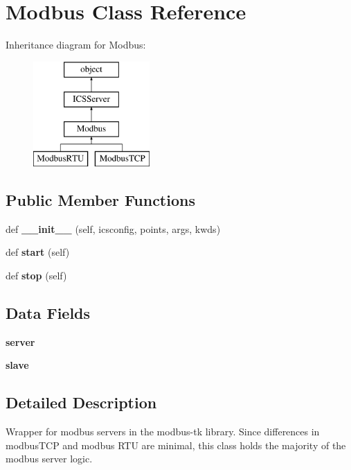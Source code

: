 \section{Modbus Class Reference}
\label{classprotolibs_1_1ics__servers_1_1_modbus}
Inheritance diagram for Modbus\+:\begin{figure}[H]
\begin{center}
\leavevmode
\includegraphics[height=4.000000cm]{classprotolibs_1_1ics__servers_1_1_modbus}
\end{center}
\end{figure}
\subsection*{Public Member Functions}
\begin{DoxyCompactItemize}
\item 
def {\bf \+\_\+\+\_\+init\+\_\+\+\_\+} (self, icsconfig, points, args, kwds)
\item 
def {\bf start} (self)
\item 
def {\bf stop} (self)
\end{DoxyCompactItemize}
\subsection*{Data Fields}
\begin{DoxyCompactItemize}
\item 
{\bf server}
\item 
{\bf slave}
\end{DoxyCompactItemize}


\subsection{Detailed Description}
\begin{DoxyVerb}Wrapper for modbus servers in the modbus-tk library. Since differences
    in modbusTCP and modbus RTU are minimal, this class holds the majority
    of the modbus server logic.\end{DoxyVerb}
 

